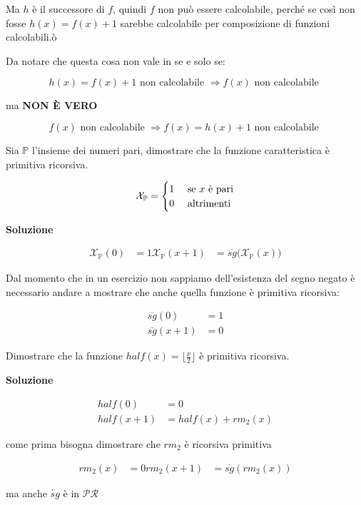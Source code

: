 Ma $ h $ è il successore di $ f $, quindi $ f $ non può essere calcolabile, perché se così non fosse $ h(x) = f(x) +1 $ sarebbe calcolabile per composizione di funzioni calcolabili.ò

Da notare che questa cosa non vale in se e solo se:

$$ h(x) = f(x) +1 \text{ non calcolabile }\Rightarrow f(x)  \text{ non calcolabile } $$

ma \textbf{NON \`{E} VERO}

$$ f(x) \text{ non calcolabile } \Rightarrow f(x) = h(x) +1 \text{ non calcolabile }$$

Sia $ \mathbb{P} $ l'insieme dei numeri pari, dimostrare che la funzione caratteristica è primitiva ricorsiva.

$$
\mathcal{X}_\mathbb{P} = \begin{cases}
1 &\text{ se $ x $ è pari} \\
0 &\text{ altrimenti}
\end{cases}
$$

\textbf{Soluzione}

\begin{align*}
\mathcal{X}_\mathbb{P}(0) &= 1
\mathcal{X}_\mathbb{P}(x+1) &= \overline{sg}\big(\mathcal{X}_\mathbb{P}(x)\big)
\end{align*}

Dal momento che in un esercizio non sappiamo dell'esistenza del segno negato è necessario andare a mostrare che anche quella funzione è primitiva ricorsiva:

\begin{align*}
 \overline{sg}(0) &= 1 \\
  \overline{sg}(x+1) &= 0
\end{align*}


Dimostrare che la funzione $ half(x) = \lfloor\frac{x}{2}\rfloor $ è primitiva ricorsiva.

\textbf{Soluzione}

\begin{align*}
half(0) &= 0 \\
half(x+1) &= half(x) + rm_2(x)
\end{align*}

come prima bisogna dimostrare che $ rm_2 $ è ricorsiva primitiva

\begin{align*}
rm_2(x) &= 0
rm_2(x+1) &= \overline{sg}(rm_2(x))
\end{align*}

ma anche $ \overleftarrow{sg} $ è in $ \mathcal{PR} $

